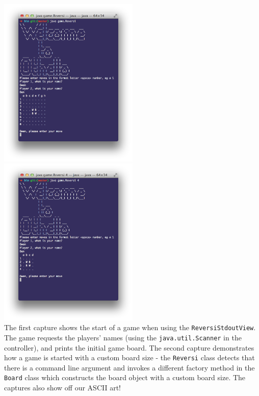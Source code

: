 \documentclass[11pt,a4paper,oneside]{article}
\begin{document}
\noindent
\includegraphics[width=0.5\textwidth]{screenies/gamestart}
\includegraphics[width=0.5\textwidth]{screenies/startsmall}\\

\noindent The first capture shows the start of a game when using the \texttt{ReversiStdoutView}. The game requests the players' names (using the \texttt{java.util.Scanner} in the controller), and prints the initial game board. The second capture demonstrates how a game is started with a custom board size - the \texttt{Reversi} class detects that there is a command line argument and invokes a different factory method in the \texttt{Board} class which constructs the board object with a custom board size. The captures also show off our ASCII art!
\end{document}
